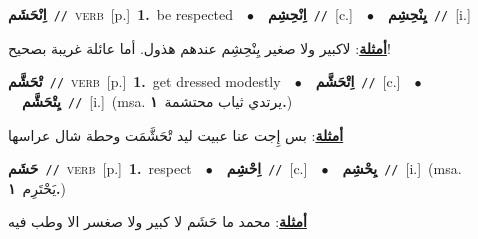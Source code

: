 \documentclass[10pt,a4paper,twoside]{article} %
\begin{document}
\begin{multicols}{2}
{\setlength\topsep{0pt}\textbf{\foreignlanguage{arabic}{اِنْحَشَم}}\ {\color{gray}\texttt{//}\color{black}}\ \textsc{verb}\ [p.]\ \textbf{1.}~be respected\ \ $\bullet$\ \ \setlength\topsep{0pt}\textbf{\foreignlanguage{arabic}{اِنْحِشِم}}\ {\color{gray}\texttt{//}\color{black}}\ [c.]\ \ $\bullet$\ \ \setlength\topsep{0pt}\textbf{\foreignlanguage{arabic}{يِنْحِشِم}}\ {\color{gray}\texttt{//}\color{black}}\ [i.]\  \begin{flushright}\color{gray}\foreignlanguage{arabic}{\textbf{\underline{\foreignlanguage{arabic}{أمثلة}}}: لاكبير ولا صغير يِنْحِشِم عندهم هذول. أما عائلة غريبة بصحيح!}\end{flushright}\color{black}} \vspace{2mm}

{\setlength\topsep{0pt}\textbf{\foreignlanguage{arabic}{تْحَشَّم}}\ {\color{gray}\texttt{//}\color{black}}\ \textsc{verb}\ [p.]\ \textbf{1.}~get dressed modestly\ \ $\bullet$\ \ \setlength\topsep{0pt}\textbf{\foreignlanguage{arabic}{اِتْحَشَّم}}\ {\color{gray}\texttt{//}\color{black}}\ [c.]\ \ $\bullet$\ \ \setlength\topsep{0pt}\textbf{\foreignlanguage{arabic}{يِتْحَشَّم}}\ {\color{gray}\texttt{//}\color{black}}\ [i.]\ \color{gray}(msa. \foreignlanguage{arabic}{يرتدي ثياب محتشمة}~\foreignlanguage{arabic}{\textbf{١.}})\color{black}\  \begin{flushright}\color{gray}\foreignlanguage{arabic}{\textbf{\underline{\foreignlanguage{arabic}{أمثلة}}}: بس إِجت عنا عبيت ليد تْحَشَّمَت وحطة شال عراسها}\end{flushright}\color{black}} \vspace{2mm}

{\setlength\topsep{0pt}\textbf{\foreignlanguage{arabic}{حَشَم}}\ {\color{gray}\texttt{//}\color{black}}\ \textsc{verb}\ [p.]\ \textbf{1.}~respect\ \ $\bullet$\ \ \setlength\topsep{0pt}\textbf{\foreignlanguage{arabic}{اِحْشِم}}\ {\color{gray}\texttt{//}\color{black}}\ [c.]\ \ $\bullet$\ \ \setlength\topsep{0pt}\textbf{\foreignlanguage{arabic}{يِحْشِم}}\ {\color{gray}\texttt{//}\color{black}}\ [i.]\ \color{gray}(msa. \foreignlanguage{arabic}{يَحْتَرِم}~\foreignlanguage{arabic}{\textbf{١.}})\color{black}\  \begin{flushright}\color{gray}\foreignlanguage{arabic}{\textbf{\underline{\foreignlanguage{arabic}{أمثلة}}}: محمد ما حَشَم لا كبير ولا صغسر الا وطب فيه}\end{flushright}\color{black}} \vspace{2mm}


\end{multicols}
\end{document}
